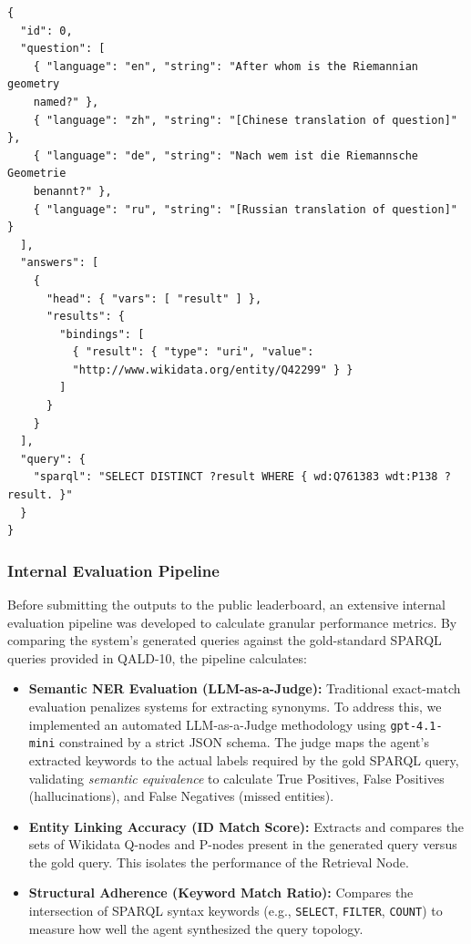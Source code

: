 \noindent
\begin{minipage}{\textwidth}
\begin{lstlisting}[basicstyle=\ttfamily\footnotesize, frame=single, caption={A truncated example of a QALD-10 dataset entry, illustrating parallel multilingual questions, ground-truth SPARQL, and expected JSON bindings.}, label={lst:qald_json}]
{
  "id": 0,
  "question": [
    { "language": "en", "string": "After whom is the Riemannian geometry 
    named?" },
    { "language": "zh", "string": "[Chinese translation of question]" },
    { "language": "de", "string": "Nach wem ist die Riemannsche Geometrie 
    benannt?" },
    { "language": "ru", "string": "[Russian translation of question]" }
  ],
  "answers": [
    {
      "head": { "vars": [ "result" ] },
      "results": {
        "bindings": [
          { "result": { "type": "uri", "value": 
          "http://www.wikidata.org/entity/Q42299" } }
        ]
      }
    }
  ],
  "query": {
    "sparql": "SELECT DISTINCT ?result WHERE { wd:Q761383 wdt:P138 ?result. }"
  }
}
\end{lstlisting}
\end{minipage}

\subsubsection{Internal Evaluation Pipeline}
Before submitting the outputs to the public leaderboard, an extensive internal evaluation pipeline was developed to calculate granular performance metrics. By comparing the system's generated queries against the gold-standard SPARQL queries provided in QALD-10, the pipeline calculates:
\begin{itemize}
    \item \textbf{Semantic NER Evaluation (LLM-as-a-Judge):} Traditional exact-match evaluation penalizes systems for extracting synonyms. To address this, we implemented an automated LLM-as-a-Judge methodology using \texttt{gpt-4.1-mini} constrained by a strict JSON schema. The judge maps the agent's extracted keywords to the actual labels required by the gold SPARQL query, validating \textit{semantic equivalence} to calculate True Positives, False Positives (hallucinations), and False Negatives (missed entities). 
    \item \textbf{Entity Linking Accuracy (ID Match Score):} Extracts and compares the sets of Wikidata Q-nodes and P-nodes present in the generated query versus the gold query. This isolates the performance of the Retrieval Node.
    \item \textbf{Structural Adherence (Keyword Match Ratio):} Compares the intersection of SPARQL syntax keywords (e.g., \texttt{SELECT}, \texttt{FILTER}, \texttt{COUNT}) to measure how well the agent synthesized the query topology.
\end{itemize}

